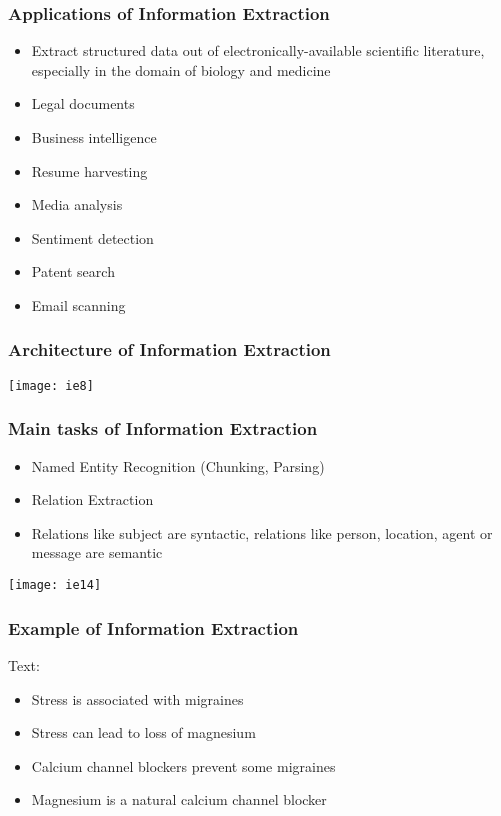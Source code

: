 \begin{frame}[fragile]
  \frametitle{Applications of Information Extraction}
  \begin{itemize}
    \item Extract structured data out of electronically-available scientific literature, especially in the domain of biology and medicine 
    \item Legal documents
    \item Business intelligence
    \item Resume harvesting
    \item Media analysis
    \item Sentiment detection
    \item Patent search
    \item Email scanning
  \end{itemize}
\end{frame}

\begin{frame}[fragile]
  \frametitle{Architecture of Information Extraction}
\begin{center}
\texttt{[image: ie8]}
\end{center}
\end{frame}

\begin{frame}[fragile]
  \frametitle{Main tasks of Information Extraction}
  \begin{itemize}
    \item Named Entity Recognition (Chunking, Parsing)
    \item Relation Extraction 
    \item Relations like subject are syntactic, relations like person, location, agent or message are semantic
  \end{itemize}
	

\begin{center}
\texttt{[image: ie14]}
\end{center}

\end{frame}

\begin{frame}[fragile]
  \frametitle{Example of Information Extraction}
Text:
  \begin{itemize}
    \item Stress is associated with migraines 
    \item Stress can lead to loss of magnesium 
    \item Calcium channel blockers prevent some migraines 
    \item Magnesium is a natural calcium channel blocker
  \end{itemize}
\end{frame}

